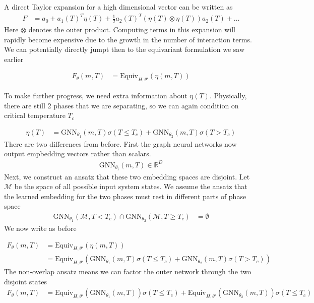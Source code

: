 \documentclass[book.tex]{subfiles}
\begin{document}
A direct Taylor expansion for a high dimensional vector can be written as
\begin{align}
F &= a_0 + a_1(T)^T \eta(T) + \frac{1}{2} a_2(T)^T (\eta(T) \otimes \eta(T)) a_2(T) + \dotsc
\end{align}
Here $\otimes$ denotes the outer product. Computing terms in this expansion will rapidly become expensive due to the growth in the number of interaction terms. We can potentially directly jumpt then to the equivariant formulation we saw earlier

\begin{align}
F_\theta(m, T) &= \textrm{Equiv}_{H,\theta'}(\eta(m, T)) 
\end{align}

To make further progress, we need extra information about $\eta(T)$. Physically, there are still 2 phases that we are separating, so we can again condition on critical temperature $T_c$

\begin{align}
\eta(T) &= \textrm{GNN}_{\theta_1}(m, T)\sigma(T \leq T_c) + \textrm{GNN}_{\theta_2}(m, T)\sigma(T > T_c)
\end{align}
There are two differences from before. First the graph neural networks now output empbedding vectors rather than scalars. 
\begin{align}
\textrm{GNN}_{\theta_i}(m, T) \in \mathbb{R}^D
\end{align}
Next, we construct an ansatz that these two embedding spaces are disjoint. Let $\mathcal{M}$ be the space of all possible input system states. We assume the ansatz that the learned embedding for the two phases must rest in different parts of phase space
\begin{align}
\textrm{GNN}_{\theta_1}(\mathcal{M}, T < T_c) \cap \textrm{GNN}_{\theta_2}(\mathcal{M}, T \geq T_c) &= \emptyset
\end{align}
We now write as before

\begin{align}
F_\theta(m, T) &= \textrm{Equiv}_{H,\theta'}(\eta(m, T)) \\
&= \textrm{Equiv}_{H,\theta'}(\textrm{GNN}_{\theta_1}(m, T)\sigma(T \leq T_c) + \textrm{GNN}_{\theta_2}(m, T)\sigma(T > T_c))
\end{align}
The non-overlap ansatz means we can factor the outer network through the two disjoint states
\begin{align}
F_\theta(m, T) &= \textrm{Equiv}_{H,\theta'}(\textrm{GNN}_{\theta_1}(m, T))\sigma(T \leq T_c)+ \textrm{Equiv}_{H,\theta'}(\textrm{GNN}_{\theta_2}(m, T))\sigma(T \leq T_c)
\end{align}
\end{document}

